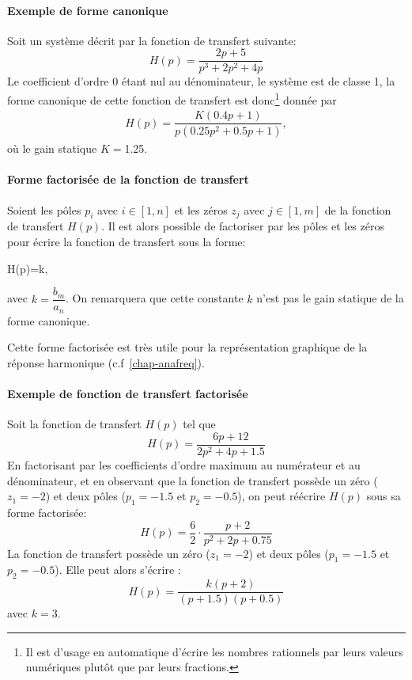 \paragraph{Exemple de forme canonique}
Soit un système décrit par la fonction de transfert suivante:
$$
H(p)=\dfrac{2p+5}{p^3+2p^2+4p}
$$
Le coefficient d'ordre 0 étant nul au dénominateur, le système est de classe 1, 
la forme canonique de cette fonction de transfert est 
donc\footnote{Il est d'usage en automatique d'écrire les nombres rationnels 
par leurs valeurs numériques plutôt que par leurs fractions. } donnée par
\begin{align*}
H(p)=\dfrac{K(0.4p+1)}{p(0.25p^2+0.5p+1)},
\end{align*}
où le gain statique $K=$1.25.

\paragraph{Forme factorisée de la fonction de transfert}
Soient les pôles $p_i$ avec $i\in[1,n]$ et les zéros $z_j$ 
avec $j\in[1,m]$ de la fonction de transfert $H(p)$. 
Il est alors possible de factoriser par les pôles et les zéros pour écrire la fonction de 
transfert sous la forme:
\begin{bequation}
H(p)=k\cdot{},
\end{bequation}
avec $k=\dfrac{b_m}{a_n}$. On remarquera que cette constante $k$ 
n'est pas le gain statique de la forme canonique.

Cette forme factorisée est très utile pour la représentation graphique
de la réponse harmonique (c.f~\cref{chap-anafreq}).

\paragraph{Exemple de fonction de transfert factorisée}

Soit la fonction de transfert $H(p)$ tel que
$$
H(p)=\dfrac{6p+12}{2p^2+4p+1.5}	
$$
En factorisant par les coefficients d'ordre maximum au numérateur et au dénominateur, et en observant 
que la fonction de transfert possède un zéro ($z_1=-2$) et deux pôles ($p_1=-1.5$ et $p_2=-0.5$), 
on peut réécrire $H(p)$ sous sa forme factorisée:
$$
H(p)=\dfrac{6}{2}\cdot\dfrac{p+2}{p^2+2p+0.75}
$$
La fonction de transfert possède un zéro ($z_1=-2$) et deux pôles ($p_1=-1.5$ et $p_2=-0.5$).
Elle peut alors s'écrire :
$$
H(p)=\dfrac{k(p+2)}{(p+1.5)(p+0.5)}
$$
avec $k=3$.
	
